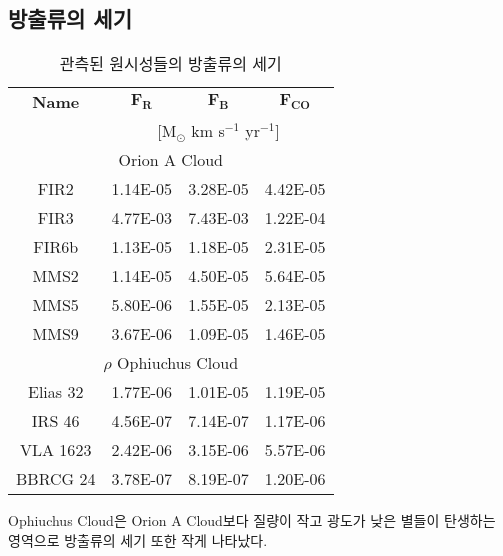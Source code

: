 \subsection{방출류의 세기}
\begin{table}[h]
	\begin{center}
		\begin{tabular}{c|c|c|c}
			\toprule
			\textbf{Name} &$\mathbf{F_{R}}$ & $\mathbf{F_{B}}$ & $\mathbf{F_{CO}}$\\
			& \multicolumn{3}{c}{[M$_{\odot}$ km s$^{-1}$ yr$^{-1}$]}\\
			\midrule
			\multicolumn{4}{c}{Orion A Cloud}\\
			\midrule
			FIR2 & 1.14E-05 & 3.28E-05 & 4.42E-05\\
			FIR3 & 4.77E-03 & 7.43E-03 & 1.22E-04\\
			FIR6b & 1.13E-05 & 1.18E-05 & 2.31E-05\\
			MMS2 & 1.14E-05 & 4.50E-05 & 5.64E-05\\
			MMS5 & 5.80E-06 & 1.55E-05 & 2.13E-05\\
			MMS9 & 3.67E-06 & 1.09E-05 & 1.46E-05\\
			\midrule
			\multicolumn{4}{c}{$\rho$ Ophiuchus Cloud}\\
			\midrule
			Elias 32 & 1.77E-06 & 1.01E-05 & 1.19E-05\\
			IRS 46 & 4.56E-07 & 7.14E-07 & 1.17E-06\\
			VLA 1623 & 2.42E-06 & 3.15E-06 & 5.57E-06\\
			BBRCG 24 & 3.78E-07 & 8.19E-07 & 1.20E-06\\
		\end{tabular}
	\end{center}
	\caption{관측된 원시성들의 방출류의 세기}
\end{table}

 Ophiuchus Cloud은 Orion A Cloud보다 질량이 작고 광도가 낮은 별들이 탄생하는 영역으로 방출류의 세기 또한 작게 나타났다. \cite{megeath2012spitzer}\\
